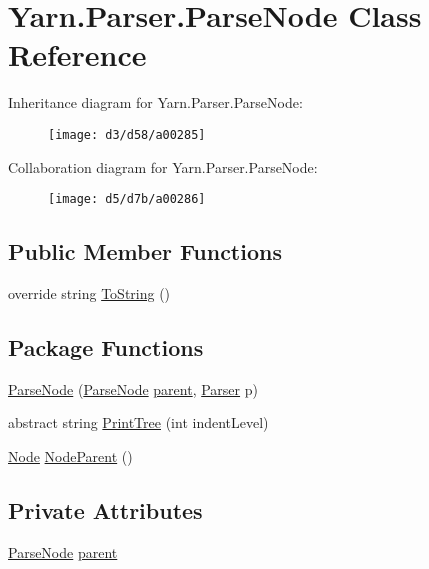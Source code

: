 \hypertarget{a00063}{\section{Yarn.\-Parser.\-Parse\-Node Class Reference}
\label{a00063}
}


Inheritance diagram for Yarn.\-Parser.\-Parse\-Node\-:
\nopagebreak
\begin{figure}[H]
\begin{center}
\leavevmode
\texttt{[image: d3/d58/a00285]}
\end{center}
\end{figure}


Collaboration diagram for Yarn.\-Parser.\-Parse\-Node\-:
\nopagebreak
\begin{figure}[H]
\begin{center}
\leavevmode
\texttt{[image: d5/d7b/a00286]}
\end{center}
\end{figure}
\subsection*{Public Member Functions}
\begin{DoxyCompactItemize}
\item 
override string \hyperlink{a00063_a18c67cb16090d0889bb9d6c8c6c565f8}{To\-String} ()
\end{DoxyCompactItemize}
\subsection*{Package Functions}
\begin{DoxyCompactItemize}
\item 
\hyperlink{a00063_a9e7e90bbaed268529230512e4b5a2f77}{Parse\-Node} (\hyperlink{a00063}{Parse\-Node} \hyperlink{a00063_af313a82103fcc2ff5a177dbb06b92f7b}{parent}, \hyperlink{a00064}{Parser} p)
\item 
abstract string \hyperlink{a00063_a0d6611653f20c2e4d90a97a96c657137}{Print\-Tree} (int indent\-Level)
\item 
\hyperlink{a00054}{Node} \hyperlink{a00063_a580e520a29444fc23ac3660cbe514a09}{Node\-Parent} ()
\end{DoxyCompactItemize}
\subsection*{Private Attributes}
\begin{DoxyCompactItemize}
\item 
\hyperlink{a00063}{Parse\-Node} \hyperlink{a00063_af313a82103fcc2ff5a177dbb06b92f7b}{parent}
\end{DoxyCompactItemize}


